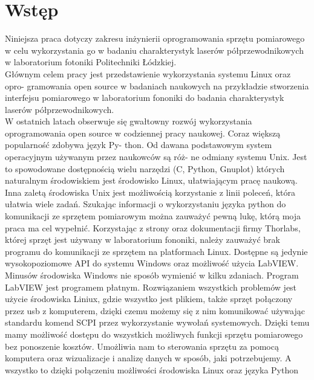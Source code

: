 \documentclass[a4paper, portrait,12pt]{report}
\begin{document}
\tableofcontents    %
\newpage

\chapter{Wstęp} \label{rozdz.wstep}
Niniejsza praca dotyczy zakresu inżynierii oprogramowania sprzętu pomiarowego w celu wykorzystania go w badaniu charakterystyk laserów półprzewodnikowych w laboratorium fotoniki Politechniki Łódzkiej. \\

Głównym celem pracy jest przedstawienie wykorzystania systemu Linux oraz opro-
gramowania open source w badaniach naukowych na przykładzie stworzenia interfejsu
pomiarowego w laboratorium fononiki do badania charakterystyk laserów półprzewodnikowych. \\

W ostatnich latach obserwuje się gwałtowny rozwój wykorzystania oprogramowania
open source w codziennej pracy naukowej. Coraz większą popularność zdobywa język Py-
thon. Od dawana podstawowym system operacyjnym używanym przez naukowców są róż-
ne odmiany systemu Unix. Jest to spowodowane dostępnością wielu narzędzi (C, Python,
Gnuplot) których naturalnym środowiskiem jest środowisko Linux, ułatwiającym pracę naukową. Inna
zaletą środowiska Unix jest możliwością korzystanie z linii poleceń, która ułatwia wiele
zadań. Szukając informacji o wykorzystaniu języka python do komunikacji ze sprzętem pomiarowym można zauważyć pewną lukę, którą moja praca ma cel wypełnić. Korzystając
z strony oraz dokumentacji firmy Thorlabs, której sprzęt jest używany w laboratorium
fononiki, należy zauważyć brak programu do komunikacji ze sprzętem na platformach Linux.
Dostępne są jedynie wysokopoziomowe API do systemu Windows oraz możliwość użycia
LabVIEW. Minusów środowiska Windows nie sposób wymienić w kilku zdaniach. Program
LabVIEW jest programem płatnym. Rozwiązaniem wszystkich problemów jest użycie środowiska Liniux, gdzie wszystko jest plikiem, także sprzęt połączony przez usb z komputerem, dzięki czemu możemy się z nim komunikować używając standardu komend SCPI przez
wykorzystanie wywołań systemowych. Dzięki temu mamy możliwość dostępu do wszystkich możliwych funkcji sprzętu pomiarowego bez ponoszenie kosztów. Umożliwia nam to
sterowania sprzętu za pomocą komputera oraz wizualizacje i analizę danych w sposób, jaki
potrzebujemy. A wszystko to dzięki połączeniu możliwości środowiska Linux oraz języka Python \\
\end{document}
